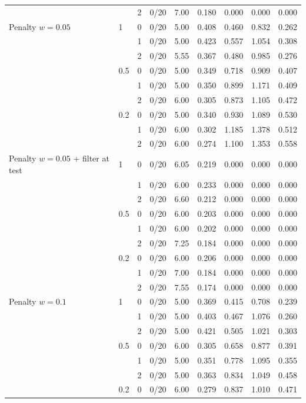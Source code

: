 {\begin{tabular}{llrrrrrrr}
 &  & 2 & 0/20 & 7.00 & 0.180 & 0.000 & 0.000 & 0.000 \\
\addlinespace
Penalty $w{=}0.05$ & 1 & 0 & 0/20 & 5.00 & 0.408 & 0.460 & 0.832 & 0.262 \\
 &  & 1 & 0/20 & 5.00 & 0.423 & 0.557 & 1.054 & 0.308 \\
 &  & 2 & 0/20 & 5.55 & 0.367 & 0.480 & 0.985 & 0.276 \\
 & 0.5 & 0 & 0/20 & 5.00 & 0.349 & 0.718 & 0.909 & 0.407 \\
 &  & 1 & 0/20 & 5.00 & 0.350 & 0.899 & 1.171 & 0.409 \\
 &  & 2 & 0/20 & 6.00 & 0.305 & 0.873 & 1.105 & 0.472 \\
 & 0.2 & 0 & 0/20 & 5.00 & 0.340 & 0.930 & 1.089 & 0.530 \\
 &  & 1 & 0/20 & 6.00 & 0.302 & 1.185 & 1.378 & 0.512 \\
 &  & 2 & 0/20 & 6.00 & 0.274 & 1.100 & 1.353 & 0.558 \\
\addlinespace
Penalty $w{=}0.05$ + filter at test & 1 & 0 & 0/20 & 6.05 & 0.219 & 0.000 & 0.000 & 0.000 \\
 &  & 1 & 0/20 & 6.00 & 0.233 & 0.000 & 0.000 & 0.000 \\
 &  & 2 & 0/20 & 6.60 & 0.212 & 0.000 & 0.000 & 0.000 \\
 & 0.5 & 0 & 0/20 & 6.00 & 0.203 & 0.000 & 0.000 & 0.000 \\
 &  & 1 & 0/20 & 6.00 & 0.202 & 0.000 & 0.000 & 0.000 \\
 &  & 2 & 0/20 & 7.25 & 0.184 & 0.000 & 0.000 & 0.000 \\
 & 0.2 & 0 & 0/20 & 6.00 & 0.206 & 0.000 & 0.000 & 0.000 \\
 &  & 1 & 0/20 & 7.00 & 0.184 & 0.000 & 0.000 & 0.000 \\
 &  & 2 & 0/20 & 7.55 & 0.174 & 0.000 & 0.000 & 0.000 \\
\addlinespace
Penalty $w{=}0.1$ & 1 & 0 & 0/20 & 5.00 & 0.369 & 0.415 & 0.708 & 0.239 \\
 &  & 1 & 0/20 & 5.00 & 0.403 & 0.467 & 1.076 & 0.260 \\
 &  & 2 & 0/20 & 5.00 & 0.421 & 0.505 & 1.021 & 0.303 \\
 & 0.5 & 0 & 0/20 & 6.00 & 0.305 & 0.658 & 0.877 & 0.391 \\
 &  & 1 & 0/20 & 5.00 & 0.351 & 0.778 & 1.095 & 0.355 \\
 &  & 2 & 0/20 & 5.00 & 0.363 & 0.834 & 1.049 & 0.458 \\
 & 0.2 & 0 & 0/20 & 6.00 & 0.279 & 0.837 & 1.010 & 0.471 \\

\end{tabular}}
